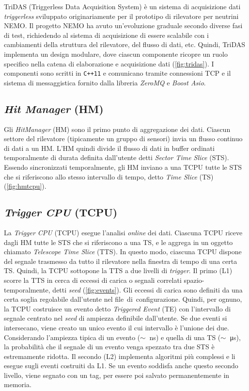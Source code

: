 \documentclass[../main.tex]{subfiles}
\begin{document}
TriDAS (Triggerless Data Acquisition System) \autocite{repo_tridas} è un sistema di acquisizione dati \emph{triggerless} sviluppato originariamente per il prototipo di rilevatore per neutrini \mbox{NEMO}.
Il progetto NEMO ha avuto un'evoluzione graduale secondo diverse fasi di test, richiedendo al sistema di acquisizione di essere scalabile con i cambiamenti della struttura del rilevatore, del flusso di dati, etc.
Quindi, TriDAS implementa un design modulare, dove ciascun componente ricopre un ruolo specifico nella catena di elaborazione e acquisizione dati (\autoref{fig:tridas}).
I componenti sono scritti in \texttt{C++11} e comunicano tramite connessioni TCP e il sistema di messaggistica fornito dalla libreria \emph{ZeroMQ} e \emph{Boost Asio}.

\subsection{\emph{Hit Manager} (HM)}
Gli \emph{HitManager} (HM) sono il primo punto di aggregazione dei dati. 
Ciascun settore del rilevatore (tipicamente un gruppo di sensori) invia un flusso continuo di dati a un HM. L'HM quindi divide il flusso di dati in buffer ordinati temporalmente di durata definita dall'utente detti \emph{Sector Time Slice} (STS). Essendo sincronizzati temporalmente, gli HM inviano a una TCPU tutte le STS che si riferiscono allo stesso intervallo di tempo, detto \emph{Time Slice} (TS) (\autoref{fig:hmtcpu}). 

\subsection{\emph{Trigger CPU} (TCPU)}
La \emph{Trigger CPU} (TCPU) esegue l'analisi \emph{online} dei dati.
Ciascuna TCPU riceve dagli HM tutte le STS che si riferiscono a una TS, e le aggrega in un oggetto chiamato \emph{Telescope Time Slice} (TTS). In questo modo, ciascuna TCPU dispone del segnale trasmesso da tutto il rilevatore nella finestra di tempo di una certa TS. Quindi, la TCPU sottopone la TTS a due livelli di \emph{trigger}.
Il primo (L1) scorre la TTS in cerca di eccessi di carica o segnali correlati spazio-temporalmente, detti \emph{seed} (\autoref{fig:events}). Gli eccessi di carica sono definiti da una certa soglia regolabile dall'utente nel \mbox{file di configurazione}. Quindi, per ognuno, la TCPU costruisce un evento detto \emph{Triggered Event} (TE) con l'intervallo di segnale centrato nel \emph{seed} di ampiezza definibile dall'utente. 
Se due eventi si intersecano, viene creato un unico evento il cui intervallo è l'unione dei due.
Considerando l'ampiezza tipica di un evento ({$\small \sim$}\SI{}{\ns}) e quella di una TS ({$\small \sim$}\SI{}{\micro \s}), la probabilità che il segnale di un evento venga spezzato tra due STS è estremamente ridotta. 
Il secondo (L2) implementa algoritmi più complessi e li esegue sugli eventi costruiti da L1. Se un evento soddisfa anche questo secondo livello, viene segnato con un tag, per essere poi salvato permanentemente in memoria.
\end{document}
